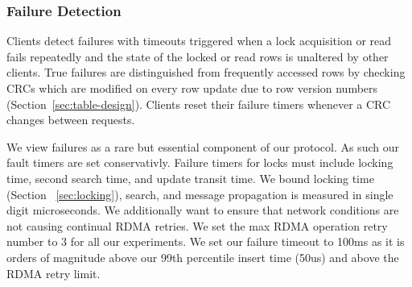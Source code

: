 
\subsubsection{Failure Detection} 

Clients detect failures with timeouts triggered when a lock
acquisition or read fails repeatedly and the state of the
locked or read rows is unaltered by other clients.  True
failures are distinguished from frequently accessed rows by
checking CRCs which are modified on every row update due to
row version numbers (Section~\ref{sec:table-design}).
Clients reset their failure timers whenever a CRC changes
between requests.


 We view failures
as a rare but essential component of our protocol. As such
our fault timers are set conservativly. Failure timers for
locks must include locking time, second search time, and
update transit time. We bound locking time (Section
~\ref{sec:locking}), search, and message propagation is
measured in single digit microseconds. We additionally want
to ensure that network conditions are not causing continual
RDMA retries. We set the max RDMA operation retry number to
3 for all our experiments. We set our failure timeout to
100ms as it is orders of magnitude above our 99th percentile
insert time (50us) and above the RDMA retry limit.


